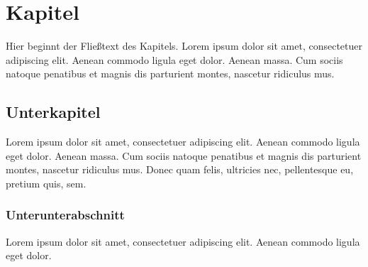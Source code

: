 

\chapter{Kapitel}
\label{chap:kapitel}

Hier beginnt der Fließtext des Kapitels.
Lorem ipsum dolor sit amet, consectetuer adipiscing elit.
Aenean commodo ligula eget dolor. Aenean massa.
Cum sociis natoque penatibus et magnis dis parturient montes, nascetur ridiculus mus.

\section{Unterkapitel}
\label{sec:unterkapitel}

Lorem ipsum dolor sit amet, consectetuer adipiscing elit.
Aenean commodo ligula eget dolor. Aenean massa.
Cum sociis natoque penatibus et magnis dis parturient montes, nascetur ridiculus mus.
Donec quam felis, ultricies nec, pellentesque eu, pretium quis, sem.

\subsection{Unterunterabschnitt}
\label{subsec:unterunterabschnitt}

Lorem ipsum dolor sit amet, consectetuer adipiscing elit.
Aenean commodo ligula eget dolor.

